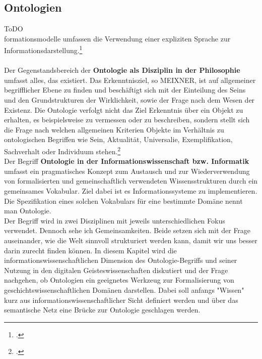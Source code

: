 \documentclass[12pt,a4paper]{article}
\begin{document}
\subsection{Ontologien}
ToDO
\\
formationsmodelle umfassen die Verwendung einer expliziten Sprache zur Informationsdarstellung.\footcite{kobler2010qualitat} 
\\
\\
Der Gegenstandsbereich der \textbf{Ontologie als Disziplin in der Philosophie} umfasst alles, das existiert. Das Erkenntnisziel, so MEIXNER, ist auf allgemeiner begrifflicher Ebene zu finden und beschäftigt sich mit der Einteilung des Seins und den Grundstrukturen der Wirklichkeit, sowie der Frage nach dem Wesen der Existenz. Die Ontologie verfolgt nicht das Ziel Erkenntnis über ein Objekt zu erhalten, es beispielsweise zu vermessen oder zu beschreiben, sondern stellt sich die Frage nach welchen allgemeinen Kriterien Objekte im Verhältnis zu ontologischen Begriffen wie Sein, Aktualität, Universalie, Exemplifikation, Sachverhalt oder Individuum stehen.\footcite{meixner1994wissenschaft}
\\
Der Begriff \textbf{Ontologie in der Informationswissenschaft bzw. Informatik} umfasst ein pragmatisches Konzept zum Austausch und zur Wiederverwendung von formalisierten und gemeinschaftlich verwendeten Wissensstrukturen durch ein gemeinsames Vokabular. Ziel dabei ist es Informationssysteme zu implementieren. Die Spezifikation eines solchen Vokabulars für eine bestimmte Domäne nennt man Ontologie.
\\
Der Begriff wird in zwei Disziplinen mit jeweils unterschiedlichen Fokus verwendet. Dennoch sehe ich Gemeinsamkeiten. Beide setzen sich mit der Frage auseinander, wie  die Welt sinnvoll strukturiert werden kann, damit wir uns besser darin zurecht finden können. In diesem Kapitel wird die informationswissenschaftlichen Dimension des Ontologie-Begriffs und seiner Nutzung in den digitalen Geisteswissenschaften diskutiert und der Frage nachgehen, ob Ontologien ein geeignetes Werkzeug zur Formalisierung von geschichtswissenschaftlichen Domänen darstellen. Dabei soll anfangs "Wissen" kurz aus informationswissenschaftlicher Sicht definiert werden und über das semantische Netz eine Brücke zur Ontologie geschlagen werden. 

\end{document}
